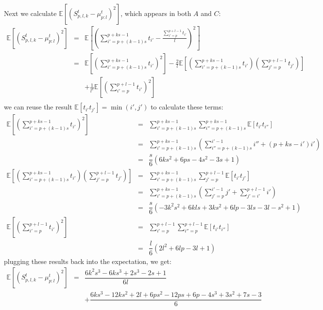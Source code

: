 \documentclass[12pt,a4paper]{article}
\newcommand{\segsum}[3]{S_{#1,#2,#3}^t} %
\newcommand{\subsmean}[2]{\mu^t_{#1:#2}} %
\newcommand{\expectation}[1]{\mathbb{E}\left[#1\right]} %
\newcommand{\segsumplk}{\segsum{p}{l}{k}} %
\newcommand{\subsmeanpl}{\subsmean{p}{l}} %
\begin{document}
Next we calculate $\expectation{(\segsumplk-\subsmeanpl)^2}$, which appears in both $A$ and $C$:
$$\begin{array}{rcl}
    \expectation{(\segsumplk-\subsmeanpl)^2} & = & \expectation{\left( \sum_{i'=p+(k-1)s}^{p+ks-1}t_{i'} - \frac{\sum_{i'=p}^{p+l-1} t_{i'}}{l} \right)^2} \\[16pt]
    & = & \expectation{\left(\sum_{i'=p+(k-1)s}^{p+ks-1}t_{i'}\right)^2}-\frac{2}{l}\expectation{\left(\sum_{i'=p+(k-1)s}^{p+ks-1}t_{i'}\right)\left(\sum_{j'=p}^{p+l-1}t_{j'}\right)}\\[16pt]
    && +\frac{1}{l^2}\expectation{\left(\sum_{i'=p}^{p+l-1}t_{i'}\right)^2} \\[16pt]
\end{array}$$
we can reuse the result $\expectation{t_{i'}t_{j'}}=\min(i',j')$ to calculate these terms:
$$\begin{array}{rcl}
    \expectation{\left(\sum_{i'=p+(k-1)s}^{p+ks-1}t_{i'}\right)^2} & = & \sum_{i'=p+(k-1)s}^{p+ks-1}\sum_{i''=p+(k-1)s}^{p+ks-1}\expectation{t_{i'}t_{i''}} \\[8pt]
    & = & \sum_{i'=p+(k-1)s}^{p+ks-1}\left(\sum_{i''=p+(k-1)s}^{i'-1}i'' + (p+ks-i')i'\right) \\[8pt]
    & = & \dfrac{s}{6} \left(6 k s^{2} + 6 p s - 4 s^{2} - 3 s + 1\right) \\[16pt]
    \expectation{\left(\sum_{i'=p+(k-1)s}^{p+ks-1}t_{i'}\right)\left(\sum_{j'=p}^{p+l-1}t_{j'}\right)} & = & \sum_{i'=p+(k-1)s}^{p+ks-1}\sum_{j'=p}^{p+l-1}\expectation{t_{i'}t_{j'}} \\[8pt]
    & = & \sum_{i'=p+(k-1)s}^{p+ks-1}\left(\sum_{j'=p}^{i'-1}j' + \sum_{j'=i'}^{p+l-1}i'\right) \\[8pt]
    & = & \dfrac{s}{6} \left(- 3 k^{2} s^{2} + 6 k l s + 3 k s^{2} + 6 l p - 3 l s - 3 l - s^{2} + 1\right) \\[16pt]
    \expectation{\left(\sum_{i'=p}^{p+l-1}t_{i'}\right)^2} & = & \sum_{i'=p}^{p+l-1}\sum_{i''=p}^{p+l-1}\expectation{t_{i'}t_{i''}} \\[8pt]
    & = & \dfrac{l}{6} \left(2 l^{2} + 6 l p - 3 l + 1\right)
\end{array}$$
plugging these results back into the expectation, we get:
$$\begin{array}{rcl}
    \expectation{(\segsumplk-\subsmeanpl)^2} & = & \dfrac{6k^{2} s^{3} - 6k s^{3} + 2s^{3} - 2s + 1}{6l} \\[12pt]
    && + \dfrac{6 k s^{3} - 12 k s^{2} + 2 l + 6 p s^{2} - 12 p s + 6 p - 4 s^{3} + 3 s^{2} + 7 s - 3}{6}\\
\end{array}$$
\end{document}

